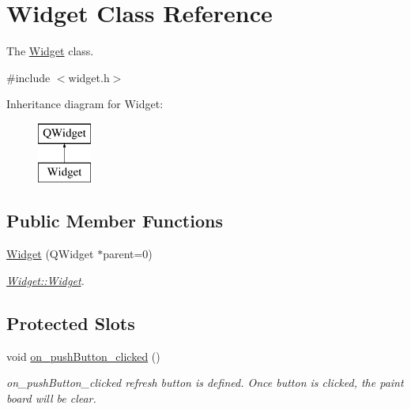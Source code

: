 \hypertarget{class_widget}{}\section{Widget Class Reference}
\label{class_widget}


The \mbox{\hyperlink{class_widget}{Widget}} class.  




{\ttfamily \#include $<$widget.\+h$>$}

Inheritance diagram for Widget\+:\begin{figure}[H]
\begin{center}
\leavevmode
\includegraphics[height=2.000000cm]{class_widget}
\end{center}
\end{figure}
\subsection*{Public Member Functions}
\begin{DoxyCompactItemize}
\item 
\mbox{\hyperlink{class_widget_a29531c7f141e461322981b3b579d4590}{Widget}} (Q\+Widget $\ast$parent=0)
\begin{DoxyCompactList}\small\item\em \mbox{\hyperlink{class_widget_a29531c7f141e461322981b3b579d4590}{Widget\+::\+Widget}}. \end{DoxyCompactList}\end{DoxyCompactItemize}
\subsection*{Protected Slots}
\begin{DoxyCompactItemize}
\item 
void \mbox{\hyperlink{class_widget_adb0d8836552ee8b48214c1a32a7e5246}{on\+\_\+push\+Button\+\_\+clicked}} ()
\begin{DoxyCompactList}\small\item\em on\+\_\+push\+Button\+\_\+clicked refresh button is defined. Once button is clicked, the paint board will be clear. \end{DoxyCompactList}\end{DoxyCompactItemize}
